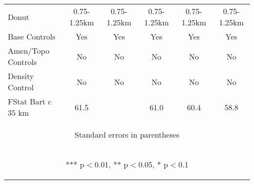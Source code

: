 \begin{tabular}{lccccc}
Donut & 0.75-1.25km & 0.75-1.25km & 0.75-1.25km & 0.75-1.25km & 0.75-1.25km \\
Base Controls & Yes & Yes & Yes & Yes & Yes \\
Amen/Topo Controls & No & No & No & No & No \\
Density Control & No & No & No & No & No \\
 FStat Bart c 35 km & 61.5 &  & 61.0 & 60.4 & 58.8 \\ \hline
\multicolumn{6}{c}{\begin{footnotesize} Standard errors in parentheses\end{footnotesize}} \\
\multicolumn{6}{c}{\begin{footnotesize} *** p$<$0.01, ** p$<$0.05, * p$<$0.1\end{footnotesize}} \\
\end{tabular}

